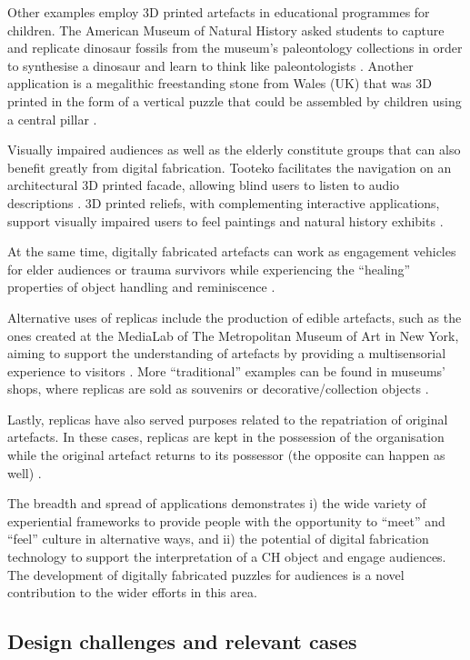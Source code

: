 \documentclass[acmlarge,screen]{acmart}
\begin{document}
Other examples employ 3D printed artefacts in educational programmes for children. The American Museum of Natural History asked students to capture and replicate dinosaur fossils from the museum's paleontology collections in order to synthesise a dinosaur and learn to think like paleontologists \cite{AMNH2013}. Another application is a megalithic freestanding stone from Wales (UK) that was 3D printed in the form of a vertical puzzle that could be assembled by children using a central pillar \cite{Miles2015}.

Visually impaired audiences as well as the elderly constitute groups that can also benefit greatly from digital fabrication. Tooteko facilitates the navigation on an architectural 3D printed facade, allowing blind users to listen to audio descriptions \cite{DAgnano2015}. 3D printed reliefs, with complementing interactive applications, support visually impaired users to feel paintings and natural history exhibits \cite{Reichinger2016a,Samaroudi2017}.

At the same time, digitally fabricated artefacts can work as engagement vehicles for elder audiences or trauma survivors while experiencing the ``healing'' properties of object handling and reminiscence \cite{PleaseTouch2016}.

Alternative uses of replicas include the production of edible artefacts, such as the ones created at the MediaLab of The Metropolitan Museum of Art in New York, aiming to support the understanding of artefacts by providing a multisensorial experience to visitors \cite{Tang2015}. More ``traditional'' examples can be found in museums' shops, where replicas are sold as souvenirs or decorative/collection objects \cite{Young2017}.

Lastly, replicas have also served purposes related to the repatriation of original artefacts. In these cases, replicas are kept in the possession of the organisation while the original artefact returns to its possessor (the opposite can happen as well) \cite{Hollinger2013}.  
 
The breadth and spread of applications demonstrates i) the wide variety of experiential frameworks to provide people with the opportunity to ``meet'' and ``feel'' culture in alternative ways, and ii) the potential of digital fabrication technology to support the interpretation of a CH object and engage audiences. The development of digitally fabricated puzzles for audiences is a novel contribution to the wider efforts in this area.
 
 \subsection{Design challenges and relevant cases}
 
\end{document}
